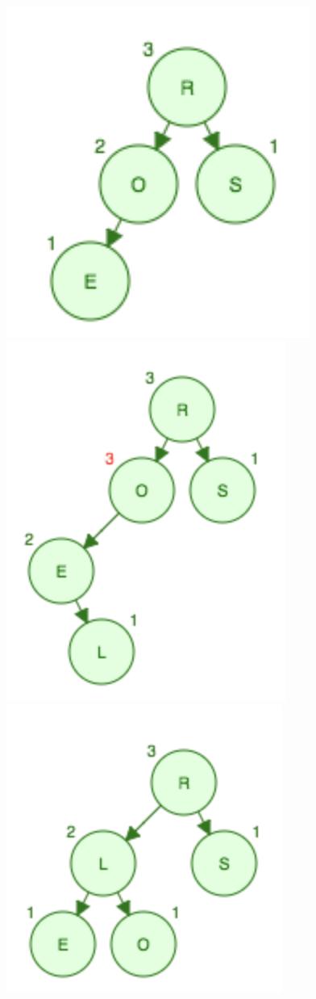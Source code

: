 \documentclass[a5paper,10pt,oneside]{article}
\begin{document}
\includegraphics[scale=0.5]{Dub1}
\includegraphics[scale=0.5]{Dub2}
\includegraphics[scale=0.5]{Dub3}
\end{document}
